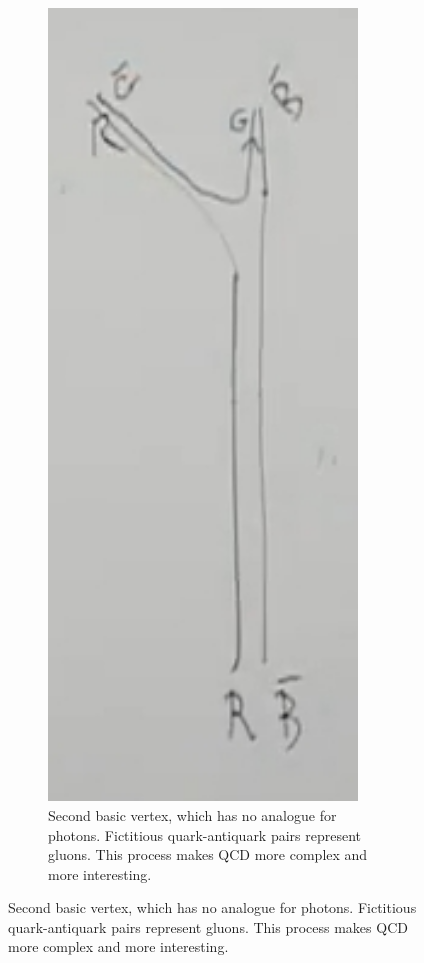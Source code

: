 \documentclass[]{article}
\begin{document}
\begin{figure}[H]
\begin{subfigure}{0.45\textwidth}
	\end{subfigure}
	\begin{subfigure}{0.45\textwidth}
		\caption{Second basic vertex, which has no analogue for photons. Fictitious quark-antiquark pairs represent gluons. This process makes QCD more complex and more interesting.}\label{2-2-gluon5}
		\includegraphics[width=0.9\textwidth]{2-2-gluon5}

\end{subfigure}
\end{figure}
\end{document}
